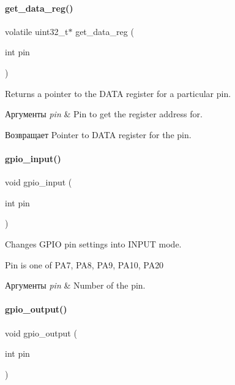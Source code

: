 \paragraph{get\+\_\+data\+\_\+reg()}
{\footnotesize\ttfamily volatile uint32\+\_\+t$\ast$ get\+\_\+data\+\_\+reg (\begin{DoxyParamCaption}\item[{int}]{pin }\end{DoxyParamCaption})}



Returns a pointer to the D\+A\+TA register for a particular pin. 


\begin{DoxyParams}{Аргументы}
{\em pin} & Pin to get the register address for.\\
\hline
\end{DoxyParams}
\begin{DoxyReturn}{Возвращает}
Pointer to D\+A\+TA register for the pin. 
\end{DoxyReturn}
\mbox{\label{rpp_8c_a7921f1e1b71c9cc703777cd08d4e1108}} 
\paragraph{gpio\+\_\+input()}
{\footnotesize\ttfamily void gpio\+\_\+input (\begin{DoxyParamCaption}\item[{int}]{pin }\end{DoxyParamCaption})}



Changes G\+P\+IO pin settings into I\+N\+P\+UT mode. 

Pin is one of P\+A7, P\+A8, P\+A9, P\+A10, P\+A20


\begin{DoxyParams}{Аргументы}
{\em pin} & Number of the pin. \\
\hline
\end{DoxyParams}
\mbox{\label{rpp_8c_a16ceea7a1891ead832a85968c75e9d81}} 
\paragraph{gpio\+\_\+output()}
{\footnotesize\ttfamily void gpio\+\_\+output (\begin{DoxyParamCaption}\item[{int}]{pin }\end{DoxyParamCaption})}




